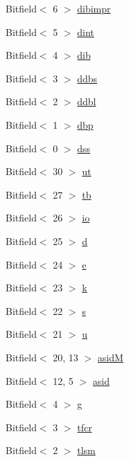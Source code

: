 \begin{DoxyCompactItemize}
Bitfield$<$ 6 $>$ \hyperlink{namespaceMipsISA_a9e8ce2fcb477f7cfaf3b96910fff85b7}{dibimpr}
\item 
Bitfield$<$ 5 $>$ \hyperlink{namespaceMipsISA_aed47aeefc09617cb8eb43344b41b29ba}{dint}
\item 
Bitfield$<$ 4 $>$ \hyperlink{namespaceMipsISA_a23476b3dc82771bdc29fbb1ecf5e022d}{dib}
\item 
Bitfield$<$ 3 $>$ \hyperlink{namespaceMipsISA_a298f77026dd0247165e3b7a67fce8e90}{ddbs}
\item 
Bitfield$<$ 2 $>$ \hyperlink{namespaceMipsISA_a236726865d37ef7f3fbb0506a7a0895d}{ddbl}
\item 
Bitfield$<$ 1 $>$ \hyperlink{namespaceMipsISA_ae3d691c11dd543efafa2b88aba7b617c}{dbp}
\item 
Bitfield$<$ 0 $>$ \hyperlink{namespaceMipsISA_ab60f27404f01653104f8cd2cd4fa9922}{dss}
\item 
Bitfield$<$ 30 $>$ \hyperlink{namespaceMipsISA_aa871a0e4096d20e353a39d933932e2b8}{ut}
\item 
Bitfield$<$ 27 $>$ \hyperlink{namespaceMipsISA_a3449fa08e02b23440cc36b67b915efb5}{tb}
\item 
Bitfield$<$ 26 $>$ \hyperlink{namespaceMipsISA_aa2c7ccd28a80dbebe704de32312ec3ac}{io}
\item 
Bitfield$<$ 25 $>$ \hyperlink{namespaceMipsISA_af6d29ee0043ba0776368f331b3a575cc}{d}
\item 
Bitfield$<$ 24 $>$ \hyperlink{namespaceMipsISA_a6be71739c6e49d0bbbd4d7bb97e0853a}{e}
\item 
Bitfield$<$ 23 $>$ \hyperlink{namespaceMipsISA_aef5e9ad990297740e743c7dbff9b9749}{k}
\item 
Bitfield$<$ 22 $>$ \hyperlink{namespaceMipsISA_a209620662d8286467e6fb5140ec75e11}{s}
\item 
Bitfield$<$ 21 $>$ \hyperlink{namespaceMipsISA_a2fc27c327acf2caaf8abc0ce0bd17aa7}{u}
\item 
Bitfield$<$ 20, 13 $>$ \hyperlink{namespaceMipsISA_a829ac0f83b9e8a2ea1780f41621184d9}{asidM}
\item 
Bitfield$<$ 12, 5 $>$ \hyperlink{namespaceMipsISA_a304206a8cceb9cd568b9d24d7528c148}{asid}
\item 
Bitfield$<$ 4 $>$ \hyperlink{namespaceMipsISA_adaa97a14cfbb88776805aa7e304aa2ce}{g}
\item 
Bitfield$<$ 3 $>$ \hyperlink{namespaceMipsISA_a16cba5095022a697d04b89d3bdc860e2}{tfcr}
\item 
Bitfield$<$ 2 $>$ \hyperlink{namespaceMipsISA_a076c808954e2734286633bbd6ba90390}{tlsm}

\end{DoxyCompactItemize}
